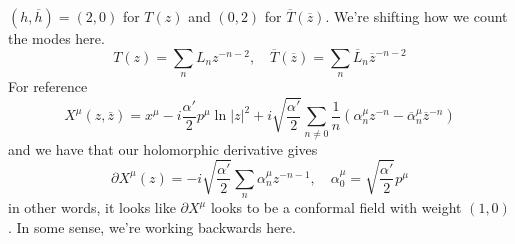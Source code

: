 \documentclass[11pt, oneside]{article}   	%
\theoremstyle{slanted}
\begin{document}
   $ \left( h , \overline{ h }  \right)   = \left( 2, 0  \right)  $ 
   for $ T \left(  z  \right)  $ and $ \left(  0 , 2  \right)  $ 
   for $ \overline{ T } \left( \overline{ z }  \right)  $. 
   We're shifting how 
   we count the modes here. 
   \[
	   T \left( z  \right)   = \sum _ n 
	   L _ n z ^{ -n - 2 } , \quad 
	   \overline{ T } \left(  \overline{ z }  \right)  
	    = \sum _ n \overline{ L } _ n \overline{ z } 
	    ^{ -n  - 2  }
   \]  For reference 
   \[
    X ^ \mu \left( z, \overline{ z }  \right)  
     = x ^ \mu  - i \frac{ \alpha ' }{ 2 } p ^ \mu \ln | z | ^ 2 
     + i \sqrt{ \frac{\alpha '  }{ 2 } }  \sum _{ n \neq 0 }
     \frac{1}{n } \left( \alpha _ n ^ \mu z ^{ - n }  - \overline{ \alpha } _ n 
     ^{ \mu } \overline{ z } ^{ - n } \right) 
   \] and we have that 
   our holomorphic 
   derivative gives 
   \[
	   \partial X ^ \mu \left(  z  \right)  
	    = - i \sqrt{ \frac{ \alpha ' }{ 2  } }  \sum _ n 
	    \alpha _ n ^ \mu z ^{ - n - 1 } , \quad \alpha _ 0 ^ \mu 
	     = \sqrt{ \frac{ \alpha  ' }{  2 } }  p ^ \mu 
     \]  in other words, it looks like 
     $ \partial   X^ \mu  $ looks to be a conformal 
     field with weight $ \left( 1, 0  \right)  $. 
     In some sense, we're working backwards here.
\end{document}
